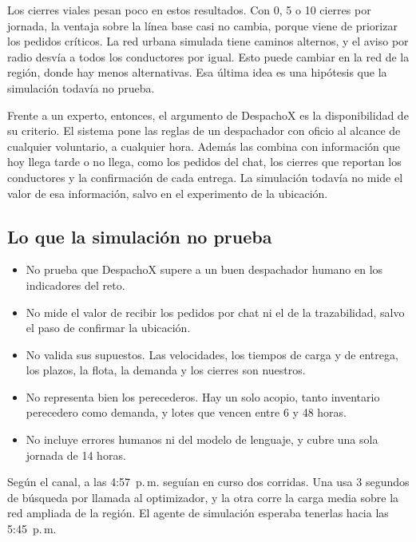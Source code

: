 Los cierres viales pesan poco en estos resultados. Con 0, 5 o 10 cierres por jornada, la ventaja sobre la línea base casi no cambia, porque viene de priorizar los pedidos críticos. La red urbana simulada tiene caminos alternos, y el aviso por radio desvía a todos los conductores por igual. Esto puede cambiar en la red de la región, donde hay menos alternativas. Esa última idea es una hipótesis que la simulación todavía no prueba.

Frente a un experto, entonces, el argumento de DespachoX es la disponibilidad de su criterio. El sistema pone las reglas de un despachador con oficio al alcance de cualquier voluntario, a cualquier hora. Además las combina con información que hoy llega tarde o no llega, como los pedidos del chat, los cierres que reportan los conductores y la confirmación de cada entrega. La simulación todavía no mide el valor de esa información, salvo en el experimento de la ubicación.

\subsection{Lo que la simulación no prueba}

\begin{itemize}
\item No prueba que DespachoX supere a un buen despachador humano en los indicadores del reto.
\item No mide el valor de recibir los pedidos por chat ni el de la trazabilidad, salvo el paso de confirmar la ubicación.
\item No valida sus supuestos. Las velocidades, los tiempos de carga y de entrega, los plazos, la flota, la demanda y los cierres son nuestros.
\item No representa bien los perecederos. Hay un solo acopio, tanto inventario perecedero como demanda, y lotes que vencen entre 6 y 48 horas.
\item No incluye errores humanos ni del modelo de lenguaje, y cubre una sola jornada de 14 horas.
\end{itemize}

Según el canal, a las 4:57~p.\,m. seguían en curso dos corridas. Una usa 3 segundos de búsqueda por llamada al optimizador, y la otra corre la carga media sobre la red ampliada de la región. El agente de simulación esperaba tenerlas hacia las 5:45~p.\,m.
